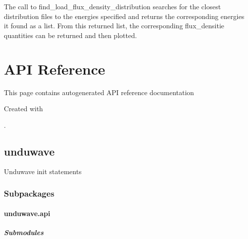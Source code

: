 \documentclass[letterpaper,10pt,english]{sphinxmanual}
\begin{document}
\sphinxAtStartPar
The call to find\_load\_flux\_density\_distribution searches for the closest distribution files to the energies specified and returns the corresponding energies it found as a list. From this returned list, the corresponding flux\_densitie quantities can be returned and then plotted.

\sphinxstepscope


\section{API Reference}
\label{\detokenize{autoapi/index:api-reference}}\label{\detokenize{autoapi/index::doc}}
\sphinxAtStartPar
This page contains auto\sphinxhyphen{}generated API reference documentation %
\begin{footnote}[1]\sphinxAtStartFootnote
Created with 
%
\end{footnote}.

\sphinxstepscope


\subsection{unduwave}
\label{\detokenize{autoapi/unduwave/index:module-unduwave}}\label{\detokenize{autoapi/unduwave/index:unduwave}}\label{\detokenize{autoapi/unduwave/index::doc}}
\sphinxAtStartPar
Unduwave init statements


\subsubsection{Subpackages}
\label{\detokenize{autoapi/unduwave/index:subpackages}}
\sphinxstepscope


\paragraph{unduwave.api}
\label{\detokenize{autoapi/unduwave/api/index:module-unduwave.api}}\label{\detokenize{autoapi/unduwave/api/index:unduwave-api}}\label{\detokenize{autoapi/unduwave/api/index::doc}}

\subparagraph{Submodules}
\label{\detokenize{autoapi/unduwave/api/index:submodules}}
\sphinxstepscope
\end{document}
